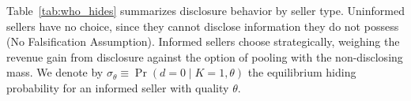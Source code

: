 Table~\ref{tab:who_hides} summarizes disclosure behavior by seller type. Uninformed sellers have no choice, since they cannot disclose information they do not possess (No Falsification Assumption). Informed sellers choose strategically, weighing the revenue gain from disclosure against the option of pooling with the non-disclosing mass. We denote by $\sigma_\theta \equiv \Pr(d=0 \mid K=1, \theta)$ the equilibrium hiding probability for an informed seller with quality $\theta$.
